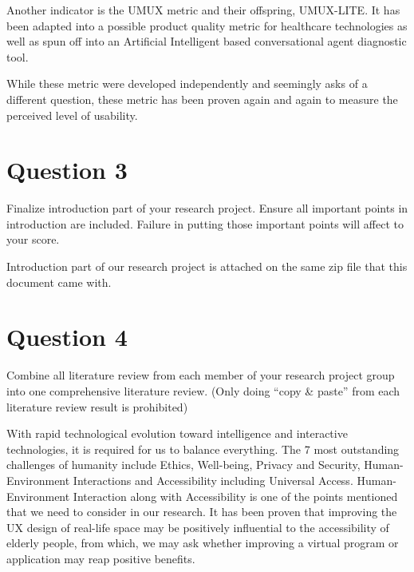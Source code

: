 \documentclass[
  11pt, %
]{assignment}
\begin{document}
Another indicator is the UMUX metric and their offspring, UMUX-LITE\@. It has been adapted into a possible product quality metric for healthcare technologies\autocite{Borsci2019IsTL} as well as spun off into an Artificial Intelligent based conversational agent diagnostic tool\autocite{Borsci2022TheCU}.

While these metric were developed independently and seemingly asks of a different question, these metric has been proven again and again to measure the perceived level of usability\autocites{Berkman2016ReassessingTU, Lewis2018MeasuringPU, Lewis2019MeasuringPU}.

\section*{Question 3}
\begin{problem}
Finalize introduction part of your research project. Ensure all important points in introduction are included. Failure in putting those important points will affect to your score.
\end{problem}

Introduction part of our research project is attached on the same zip file that this document came with.

\section*{Question 4}
\begin{problem}
Combine all literature review from each member of your research project group into one comprehensive literature review. (Only doing “copy \& paste” from each literature review result is prohibited)
\end{problem}

With rapid technological evolution toward intelligence and interactive technologies, it is required for us to balance everything. The 7 most outstanding challenges of humanity include Ethics, Well-being, Privacy and Security, Human-Environment Interactions and Accessibility including Universal Access\autocite{Stephanidis2019SevenHG}. Human-Environment Interaction along with Accessibility is one of the points mentioned that we need to consider in our research. It has been proven that improving the UX design of real-life space may be positively influential to the accessibility of elderly people\autocite{Yoo2021TheEO}, from which, we may ask whether improving a virtual program or application may reap positive benefits.
\end{document}

